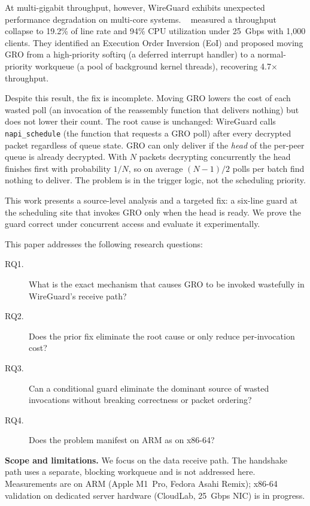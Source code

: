\documentclass{article}
\begin{document}
At multi-gigabit throughput, however, WireGuard exhibits unexpected performance
degradation on multi-core systems. \citeauthor{mounah2025}~\cite{mounah2025}
measured a throughput collapse to 19.2\% of line rate and 94\% CPU utilization
under 25~Gbps with 1,000 clients. They identified an Execution Order Inversion
(EoI) and proposed moving GRO from a high-priority softirq (a deferred
interrupt handler) to a normal-priority workqueue (a pool of background kernel
threads), recovering 4.7$\times$ throughput.

Despite this result, the fix is incomplete. Moving GRO lowers the cost of each
wasted poll (an invocation of the reassembly function that delivers nothing) but
does not lower their count. The root cause is unchanged: WireGuard calls
\texttt{napi\_schedule} (the function that requests a GRO poll) after every
decrypted packet regardless of queue state. GRO can only deliver if the \emph{head} of the per-peer queue is
already decrypted. With $N$ packets decrypting concurrently the head finishes
first with probability $1/N$, so on average $(N\!-\!1)/2$ polls per batch find
nothing to deliver. The problem is in the trigger logic, not the scheduling
priority.

This work presents a source-level analysis and a targeted fix: a six-line guard
at the scheduling site that invokes GRO only when the head is ready. We prove
the guard correct under concurrent access and evaluate it experimentally.

\smallskip\noindent This paper addresses the following research questions:
\begin{description}
  \item[RQ1.] What is the exact mechanism that causes GRO to be invoked
    wastefully in WireGuard's receive path?
  \item[RQ2.] Does the prior fix eliminate the root cause or only reduce
    per-invocation cost?
  \item[RQ3.] Can a conditional guard eliminate the dominant source of wasted
    invocations without breaking correctness or packet ordering?
  \item[RQ4.] Does the problem manifest on ARM as on x86-64?
\end{description}

\smallskip\noindent\textbf{Scope and limitations.} We focus on the data receive
path. The handshake path uses a separate, blocking workqueue and is not
addressed here. Measurements are on ARM (Apple M1~Pro, Fedora Asahi Remix);
x86-64 validation on dedicated server hardware (CloudLab, 25~Gbps NIC) is in
progress.
\end{document}
